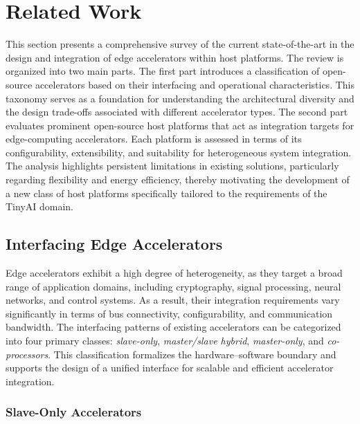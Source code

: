     \section{Related Work}
    \label{sec:related_work}
    
        This section presents a comprehensive survey of the current state-of-the-art in the design and integration of edge accelerators within host platforms. The review is organized into two main parts. The first part introduces a classification of open-source accelerators based on their interfacing and operational characteristics. This taxonomy serves as a foundation for understanding the architectural diversity and the design trade-offs associated with different accelerator types. The second part evaluates prominent open-source host platforms that act as integration targets for edge-computing accelerators. Each platform is assessed in terms of its configurability, extensibility, and suitability for heterogeneous system integration. The analysis highlights persistent limitations in existing solutions, particularly regarding flexibility and energy efficiency, thereby motivating the development of a new class of host platforms specifically tailored to the requirements of the TinyAI domain.
    
        \subsection{Interfacing Edge Accelerators}
    
            Edge accelerators exhibit a high degree of heterogeneity, as they target a broad range of application domains, including cryptography, signal processing, neural networks, and control systems. As a result, their integration requirements vary significantly in terms of bus connectivity, configurability, and communication bandwidth. The interfacing patterns of existing accelerators can be categorized into four primary classes: \emph{slave-only}, \emph{master/slave hybrid}, \emph{master-only}, and \emph{co-processors}. This classification formalizes the hardware–software boundary and supports the design of a unified interface for scalable and efficient accelerator integration.

            \vspace{-1em}
            \subsubsection*{Slave-Only Accelerators}
            
